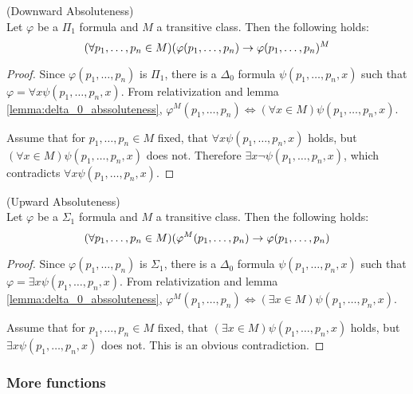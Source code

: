 \begin{lemma}{(Downward Absoluteness)}\label{lemma:downward_absoluteness}\\
Let $\varphi$ be a $\Pi_1$ formula and $M$ a transitive class. Then the following holds:
\begin{equation}
(\forall p_1, \ldots, p_n \in M)(\varphi(p_1, \ldots, p_n) \rightarrow \varphi(p_1, \ldots, p_n)^M
\end{equation}
\end{lemma}
\begin{proof}
Since $\varphi(p_1, \ldots, p_n)$ is $\Pi_1$, there is a $\Delta_0$ formula $\psi(p_1, \ldots, p_n, x)$ such that $\varphi = \forall x \psi(p_1, \ldots, p_n, x)$. From relativization and lemma \ref{lemma:delta_0_abssoluteness}, $\varphi^M(p_1, \ldots, p_n) \iff (\forall x \in M)\psi(p_1, \ldots, p_n, x)$.

Assume that for $p_1, \ldots, p_n \in M$ fixed, that $\forall x \psi(p_1, \ldots, p_n, x)$ holds, but $(\forall x \in M)\psi(p_1, \ldots, p_n, x)$ does not. 
Therefore $\exists x \neg \psi(p_1, \ldots, p_n, x)$, which contradicts $\forall x \psi(p_1, \ldots, p_n, x)$.
\end{proof}


\begin{lemma}{(Upward Absoluteness)}\label{lemma:upward_absoluteness}\\
Let $\varphi$ be a $\Sigma_1$ formula and $M$ a transitive class. Then the following holds:
\begin{equation}
(\forall p_1, \ldots, p_n \in M)(\varphi^M(p_1, \ldots, p_n) \rightarrow \varphi(p_1, \ldots, p_n)
\end{equation}
\end{lemma}
\begin{proof}
Since $\varphi(p_1, \ldots, p_n)$ is $\Sigma_1$, there is a $\Delta_0$ formula $\psi(p_1, \ldots, p_n, x)$ such that $\varphi = \exists x \psi(p_1, \ldots, p_n, x)$. From relativization and lemma \ref{lemma:delta_0_abssoluteness}, $\varphi^M(p_1, \ldots, p_n) \iff (\exists x \in M)\psi(p_1, \ldots, p_n, x)$.

Assume that for $p_1, \ldots, p_n \in M$ fixed, that $(\exists x \in M)\psi(p_1, \ldots, p_n, x)$ holds, but $\exists x \psi(p_1, \ldots, p_n, x)$ does not. This is an obvious contradiction.
\end{proof}


\subsubsection{More functions}


